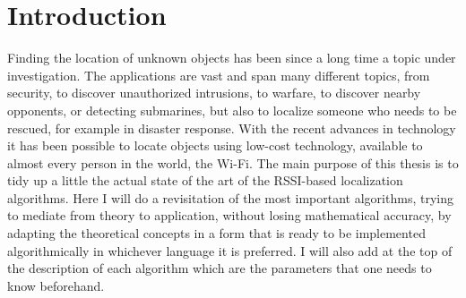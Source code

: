 \documentclass[12pt]{report}
\begin{document}
\clearpage %
\begingroup
  \thispagestyle{empty}
  \null
  \newpage
\endgroup


\thispagestyle{empty}
\tableofcontents
\thispagestyle{empty}

\clearpage %
\begingroup
  \thispagestyle{empty}
  \null
  \newpage
\endgroup


\setcounter{page}{1}

\chapter{Introduction}
Finding the location of unknown objects has been since a long time a topic under investigation. The applications are vast and span many different topics, from security, to discover unauthorized intrusions, to warfare, to discover nearby opponents, or detecting submarines, but also to localize someone who needs to be rescued, for example in disaster response. With the recent advances in technology it has been possible to locate objects using low-cost technology, available to almost every person in the world, the Wi-Fi. The main purpose of this thesis is to tidy up a little the actual state of the art of the RSSI-based localization algorithms. Here I will do a revisitation of the most important algorithms, trying to mediate from theory to application, without losing mathematical accuracy, by adapting the theoretical concepts in a form that is ready to be implemented algorithmically in whichever language it is preferred. I will also add at the top of the description of each algorithm which are the parameters that one needs to know beforehand.
\end{document}

